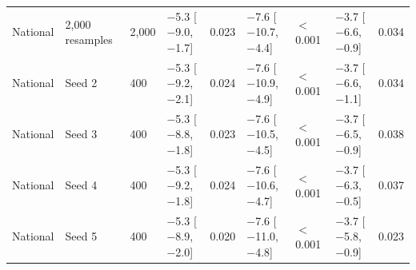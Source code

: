\begin{longtable}{L{1.2cm} L{2.2cm} C{0.7cm} C{2.5cm} C{0.9cm} C{2.5cm} C{0.9cm} C{2.5cm} C{0.9cm}}
National & 2,000 resamples & 2,000 & $-$5.3 {\scriptsize[$-$9.0, $-$1.7]} & 0.023 & $-$7.6 {\scriptsize[$-$10.7, $-$4.4]} & $<$0.001 & $-$3.7 {\scriptsize[$-$6.6, $-$0.9]} & 0.034 \\
National & Seed 2 & 400 & $-$5.3 {\scriptsize[$-$9.2, $-$2.1]} & 0.024 & $-$7.6 {\scriptsize[$-$10.9, $-$4.9]} & $<$0.001 & $-$3.7 {\scriptsize[$-$6.6, $-$1.1]} & 0.034 \\
National & Seed 3 & 400 & $-$5.3 {\scriptsize[$-$8.8, $-$1.8]} & 0.023 & $-$7.6 {\scriptsize[$-$10.5, $-$4.5]} & $<$0.001 & $-$3.7 {\scriptsize[$-$6.5, $-$0.9]} & 0.038 \\
National & Seed 4 & 400 & $-$5.3 {\scriptsize[$-$9.2, $-$1.8]} & 0.024 & $-$7.6 {\scriptsize[$-$10.6, $-$4.7]} & $<$0.001 & $-$3.7 {\scriptsize[$-$6.3, $-$0.5]} & 0.037 \\
National & Seed 5 & 400 & $-$5.3 {\scriptsize[$-$8.9, $-$2.0]} & 0.020 & $-$7.6 {\scriptsize[$-$11.0, $-$4.8]} & $<$0.001 & $-$3.7 {\scriptsize[$-$5.8, $-$0.9]} & 0.023 \\
\end{longtable}
\endgroup
